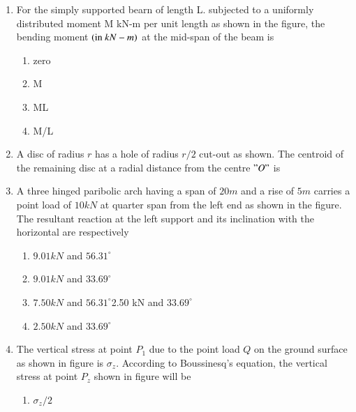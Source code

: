 \documentclass[journal]{IEEEtran}
\begin{document}
\begin{enumerate}
	\item For the simply supported bearn of length L. subjected to a uniformly distributed moment M kN-m per unit length as shown in the figure, the bending moment $\left(\text{in } kN-m\right)$ at the mid-span of the beam is
     	
		\begin{enumerate}
			\item zero
            \item M
            \item ML
            \item M/L
        	\end{enumerate}	
	\item  A disc of radius $r$ has a hole of radius $r / 2$ cut-out as shown. The centroid of the remaining disc  at a radial distance from the centre $"O"$ is
        	
		\begin{enumerate}
        	\end{enumerate}	
	\item A three hinged paribolic arch having a span of $20 m$ and a rise of $5 m$ carries a point load of $10 kN$ at quarter span from the left end as shown in the figure. The resultant reaction at the left support and its inclination with the horizontal are respectively
         	
                \begin{enumerate}
			\item $9.01 kN$ and $56.31^{\circ}$
			\item $9.01 kN$ and $33.69^{\circ}$
			\item $7.50 kN$ and $56.31^{\circ}$2.50 kN and $33.69^{\circ}$
			\item $2.50 kN$ and $33.69^{\circ}$
        	\end{enumerate}		
	\item The vertical stress at point $P_{1}$ due to the point load $Q$ on the ground surface as shown in figure is $\sigma_{z}$. According to Boussinesq's equation, the vertical stress at point $P_{z}$ shown in figure will be
        	
		\begin{enumerate}
			\item $\sigma_{z} / 2$

\end{enumerate}
\end{enumerate}
\end{document}
